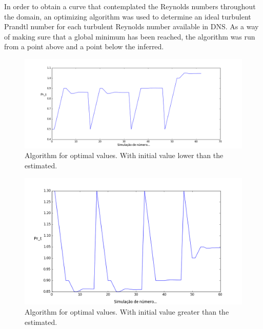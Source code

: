 \documentclass[10pt]{article} %
\begin{document}
In order to obtain a curve that contemplated the Reynolds numbers throughout the domain, an optimizing algorithm was used to determine an ideal turbulent Prandtl number for each turbulent Reynolds number available in DNS.
As a way of making sure that a global minimum has been reached, the algorithm was run from a point above and a point below the inferred.	\\
	\begin{figure}[!h]
		\centering
		\includegraphics[angle=0, scale=0.20]{convergnciacima}
		\caption{Algorithm for optimal values. With initial value lower than the estimated.}
	\end{figure}
	\begin{figure}[!h]
		\centering
		\includegraphics[angle=0, scale=0.10]{convergnciabaixo}
		\caption{Algorithm for optimal values. With initial value greater than the estimated.}
	\end{figure}
\end{document}
